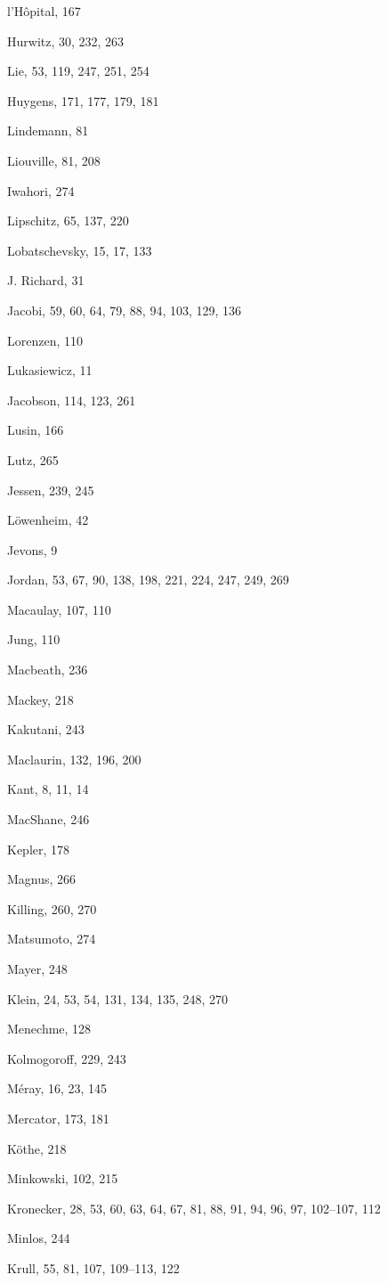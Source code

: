 l'Hôpital, 167

Hurwitz, 30, 232, 263

Lie, 53, 119, 247, 251, 254

Huygens, 171, 177, 179, 181

Lindemann, 81

Liouville, 81, 208

Iwahori, 274

Lipschitz, 65, 137, 220

Lobatschevsky, 15, 17, 133

J. Richard, 31

Jacobi, 59, 60, 64, 79, 88, 94, 103, 129, 136

Lorenzen, 110

Lukasiewicz, 11

Jacobson, 114, 123, 261

Lusin, 166

Lutz, 265

Jessen, 239, 245

Löwenheim, 42

Jevons, 9

Jordan, 53, 67, 90, 138, 198, 221, 224, 247, 249, 269

Macaulay, 107, 110

Jung, 110

Macbeath, 236

Mackey, 218

Kakutani, 243

Maclaurin, 132, 196, 200

Kant, 8, 11, 14

MacShane, 246

Kepler, 178

Magnus, 266

Killing, 260, 270

Matsumoto, 274

Mayer, 248

Klein, 24, 53, 54, 131, 134, 135, 248, 270

Menechme, 128

Kolmogoroff, 229, 243

Méray, 16, 23, 145

Mercator, 173, 181

Köthe, 218

Minkowski, 102, 215

Kronecker, 28, 53, 60, 63, 64, 67, 81, 88, 91, 94, 96, 97, 102--107, 112

Minlos, 244

Krull, 55, 81, 107, 109--113, 122


